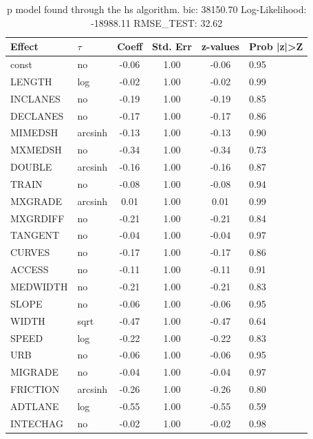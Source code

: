 \begin{table}
	\caption{p model found through the hs algorithm. bic: 38150.70 Log-Likelihood: -18988.11 RMSE_TEST: 32.62}
	\begin{center}
		\begin{tabular}{|l|l|c|c|c|l|}
			\hline
			Effect & $\tau$ & Coeff & Std. Err & z-values & Prob |z|>Z \\
			\hline
			const & no & -0.06 & 1.00 & -0.06 & 0.95 \\
			\hline
			LENGTH & log & -0.02 & 1.00 & -0.02 & 0.99 \\
			\hline
			INCLANES & no & -0.19 & 1.00 & -0.19 & 0.85 \\
			\hline
			DECLANES & no & -0.17 & 1.00 & -0.17 & 0.86 \\
			\hline
			MIMEDSH & arcsinh & -0.13 & 1.00 & -0.13 & 0.90 \\
			\hline
			MXMEDSH & no & -0.34 & 1.00 & -0.34 & 0.73 \\
			\hline
			DOUBLE & arcsinh & -0.16 & 1.00 & -0.16 & 0.87 \\
			\hline
			TRAIN & no & -0.08 & 1.00 & -0.08 & 0.94 \\
			\hline
			MXGRADE & arcsinh & 0.01 & 1.00 & 0.01 & 0.99 \\
			\hline
			MXGRDIFF & no & -0.21 & 1.00 & -0.21 & 0.84 \\
			\hline
			TANGENT & no & -0.04 & 1.00 & -0.04 & 0.97 \\
			\hline
			CURVES & no & -0.17 & 1.00 & -0.17 & 0.86 \\
			\hline
			ACCESS & no & -0.11 & 1.00 & -0.11 & 0.91 \\
			\hline
			MEDWIDTH & no & -0.21 & 1.00 & -0.21 & 0.83 \\
			\hline
			SLOPE & no & -0.06 & 1.00 & -0.06 & 0.95 \\
			\hline
			WIDTH & sqrt & -0.47 & 1.00 & -0.47 & 0.64 \\
			\hline
			SPEED & log & -0.22 & 1.00 & -0.22 & 0.83 \\
			\hline
			URB & no & -0.06 & 1.00 & -0.06 & 0.95 \\
			\hline
			MIGRADE & no & -0.04 & 1.00 & -0.04 & 0.97 \\
			\hline
			FRICTION & arcsinh & -0.26 & 1.00 & -0.26 & 0.80 \\
			\hline
			ADTLANE & log & -0.55 & 1.00 & -0.55 & 0.59 \\
			\hline
			INTECHAG & no & -0.02 & 1.00 & -0.02 & 0.98 \\
			\hline

\end{tabular}
\end{center}
\end{table}
